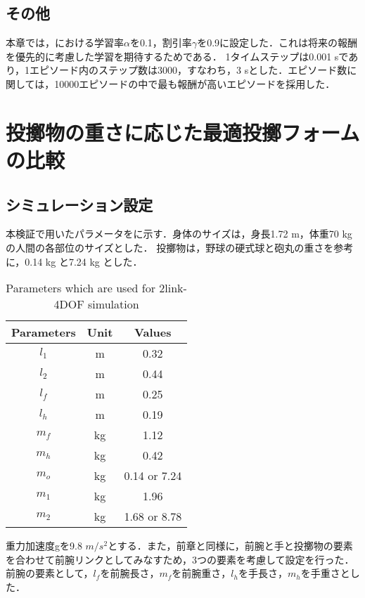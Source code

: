 \subsection{その他}
本章では，における学習率$\alpha$を0.1，割引率$\gamma$を0.9に設定した．これは将来の報酬を優先的に考慮した学習を期待するためである．
1タイムステップは0.001 sであり，1エピソード内のステップ数は3000，すなわち，3 sとした．エピソード数に関しては，10000エピソードの中で最も報酬が高いエピソードを採用した．

\section{投擲物の重さに応じた最適投擲フォームの比較}
\subsection{シミュレーション設定}
本検証で用いたパラメータをに示す．身体のサイズは，身長1.72 m，体重70 kgの人間の各部位のサイズとした．
投擲物は，野球の硬式球と砲丸の重さを参考に，0.14 kg と7.24 kg とした．
\begin{table}[tb]
  \begin{center}
    \caption{Parameters which are used for 2link-4DOF simulation}

    \begin{tabular}{c|c|c}
      \hline
      Parameters & Unit & Values \\
      \hline
      $l_{1}$ & m & 0.32 \\
      $l_{2}$ & m & 0.44 \\
      $l_{f}$ & m & 0.25 \\
      $l_{h}$ & m & 0.19 \\
      $m_{f}$ & kg & 1.12 \\
      $m_{h}$ & kg & 0.42 \\
      $m_{o}$ & kg & 0.14 or 7.24 \\
      $m_{1}$ & kg & 1.96 \\
      $m_{2}$ & kg & 1.68 or 8.78 \\
      \hline
    \end{tabular}
  \end{center}
\end{table}
重力加速度gを9.8 $m/s^{2}$とする．また，前章と同様に，前腕と手と投擲物の要素を合わせて前腕リンクとしてみなすため，3つの要素を考慮して設定を行った．
前腕の要素として，$l_{f}$を前腕長さ，$m_{f}$を前腕重さ，$l_{h}$を手長さ，$m_{h}$を手重さとした．\\

